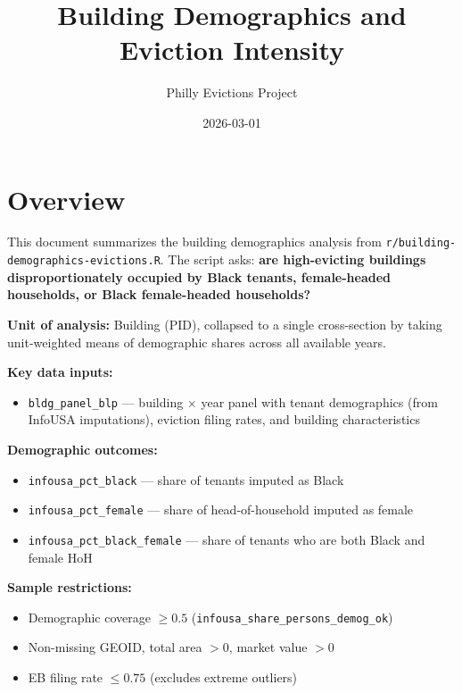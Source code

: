 \documentclass[
  11pt,
]{article}
\title{Building Demographics and Eviction Intensity}
\author{Philly Evictions Project}
\date{2026-03-01}
\providecommand{\tightlist}{%
  \setlength{\itemsep}{0pt}\setlength{\parskip}{0pt}}
\renewcommand*\contentsname{Table of contents}
\newcommand\contentsname{Table of contents}
\begin{document}
\maketitle

\renewcommand*\contentsname{Table of contents}
{
\hypersetup{linkcolor=}
\setcounter{tocdepth}{3}
\tableofcontents
}

\section{Overview}\label{overview}

This document summarizes the building demographics analysis from
\texttt{r/building-demographics-evictions.R}. The script asks:
\textbf{are high-evicting buildings disproportionately occupied by Black
tenants, female-headed households, or Black female-headed households?}

\textbf{Unit of analysis:} Building (PID), collapsed to a single
cross-section by taking unit-weighted means of demographic shares across
all available years.

\textbf{Key data inputs:}

\begin{itemize}
\tightlist
\item
  \texttt{bldg\_panel\_blp} --- building \(\times\) year panel with
  tenant demographics (from InfoUSA imputations), eviction filing rates,
  and building characteristics
\end{itemize}

\textbf{Demographic outcomes:}

\begin{itemize}
\tightlist
\item
  \texttt{infousa\_pct\_black} --- share of tenants imputed as Black
\item
  \texttt{infousa\_pct\_female} --- share of head-of-household imputed
  as female
\item
  \texttt{infousa\_pct\_black\_female} --- share of tenants who are both
  Black and female HoH
\end{itemize}

\textbf{Sample restrictions:}

\begin{itemize}
\tightlist
\item
  Demographic coverage \(\geq 0.5\)
  (\texttt{infousa\_share\_persons\_demog\_ok})
\item
  Non-missing GEOID, total area \(> 0\), market value \(> 0\)
\item
  EB filing rate \(\leq 0.75\) (excludes extreme outliers)
\end{itemize}
\end{document}
